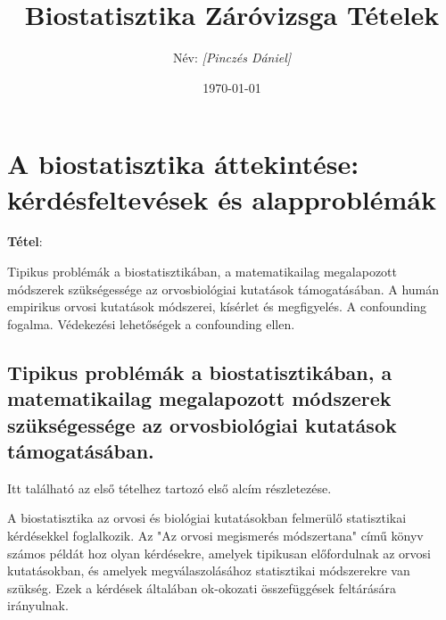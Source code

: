 \documentclass[a4paper,12pt]{article}
\title{\textbf{Biostatisztika Záróvizsga Tételek}}
\author{Név: \textit{[Pinczés Dániel]}}
\date{\today}
\begin{document}
\maketitle
\thispagestyle{empty}
\newpage

\tableofcontents
\newpage

\section{A biostatisztika áttekintése: kérdésfeltevések és alapproblémák}

\textbf{Tétel}: 

Tipikus problémák a biostatisztikában, a matematikailag megalapozott módszerek
szükségessége az orvosbiológiai kutatások támogatásában. A humán empirikus orvosi
kutatások módszerei, kísérlet és megfigyelés. A confounding fogalma. Védekezési
lehetőségek a confounding ellen.

\subsection{Tipikus problémák a biostatisztikában, a matematikailag megalapozott módszerek
szükségessége az orvosbiológiai kutatások támogatásában.}
Itt található az első tételhez tartozó első alcím részletezése.

A biostatisztika az orvosi és biológiai kutatásokban felmerülő statisztikai kérdésekkel foglalkozik. Az "Az orvosi megismerés módszertana" című könyv számos példát hoz olyan kérdésekre, amelyek tipikusan előfordulnak az orvosi kutatásokban, és amelyek megválaszolásához statisztikai módszerekre van szükség. Ezek a kérdések általában ok-okozati összefüggések feltárására irányulnak.
\end{document}

